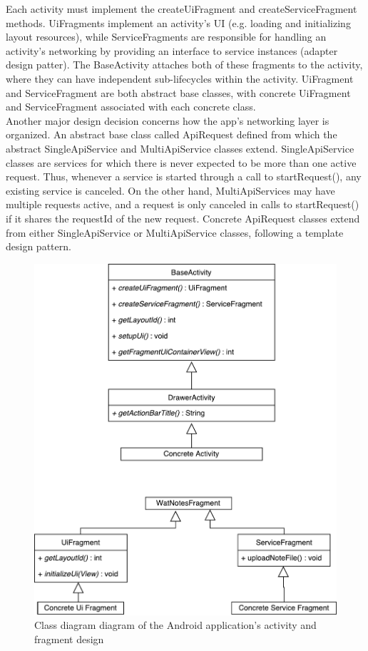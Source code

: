 \documentclass[12pt]{article}
\begin{document}
    Each activity must implement the createUiFragment and createServiceFragment methods. UiFragments implement an activity's UI (e.g. loading and
    initializing layout resources), while ServiceFragments are responsible for handling an activity's networking by providing an interface
    to service instances (adapter design patter). The BaseActivity attaches both of these fragments to the activity, where they can have independent sub-lifecycles
    within the activity. UiFragment and ServiceFragment are both abstract base classes, with concrete UiFragment and ServiceFragment associated with each
    concrete class. \\

    Another major design decision concerns how the app's networking layer is organized. An abstract base class called ApiRequest defined from which the abstract
    SingleApiService and MultiApiService classes extend. SingleApiService classes are services for which there is never expected to be more than one active request. Thus, whenever
    a service is started through a call to startRequest(), any existing service is canceled. On the other hand, MultiApiServices may have multiple requests active,
    and a request is only canceled in calls to startRequest() if it shares the requestId of the new request. Concrete ApiRequest classes extend from either
    SingleApiService or MultiApiService classes, following a template design pattern. \\

    \begin{figure}[H]
      \includegraphics[width=\textwidth]{assets/android-activity-class.pdf}
      \caption{Class diagram diagram of the Android application's activity and fragment design}
    \end{figure}
\end{document}
